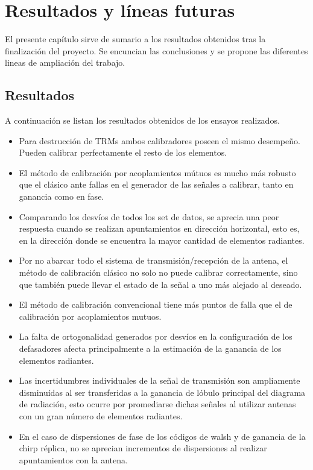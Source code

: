 \chapter{Resultados y líneas futuras}

El presente capítulo sirve de sumario a los resultados obtenidos tras la finalización del proyecto. Se encuncian las 
conclusiones y se propone las diferentes lineas de ampliación del trabajo.

\section{Resultados}

A continuación se listan los resultados obtenidos de los ensayos realizados.
\begin{itemize}
	\item Para destrucción de TRMs ambos calibradores poseen el mismo desempeño. Pueden calibrar perfectamente el resto de los 
		elementos.
	\item El método de calibración por acoplamientos mútuos es mucho más robusto que el clásico ante fallas en el generador 
		de las señales a calibrar, tanto en ganancia como en fase.
	\item Comparando los desvíos de todos los set de datos, se aprecia una peor respuesta cuando se realizan apuntamientos 
		en dirección horizontal, esto es, en la dirección donde se encuentra la mayor cantidad de elementos radiantes.
	\item Por no abarcar todo el sistema de transmisión/recepción de la antena, el método de calibración clásico no solo no 
		puede calibrar correctamente, sino que también puede llevar el estado de la señal a uno más alejado al deseado.
	\item El método de calibración convencional tiene más puntos de falla que el de calibración por acoplamientos mutuos.
	\item La falta de ortogonalidad generados por desvíos en la configuración de los defasadores afecta principalmente a la 
		estimación de la ganancia de los elementos radiantes.
	\item Las incertidumbres individuales de la señal de transmisión son ampliamente disminuídas al ser transferidas a la 
		ganancia de lóbulo principal del diagrama de radiación, esto ocurre por promediarse dichas señales al utilizar antenas 
		con un gran número de elementos radiantes.
	\item En el caso de dispersiones de fase de los códigos de walsh y de ganancia de la chirp réplica, no se aprecian incrementos
		de dispersiones al realizar apuntamientos con la antena.
\end{itemize}

